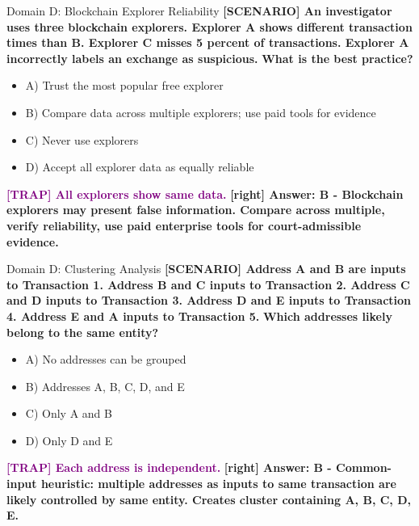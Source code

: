\documentclass[11pt,a4paper]{beamer}
\newcommand{\trap}[1]{\textcolor{purple}{\textbf{[TRAP] #1}}}
\newcommand{\correct}[1]{\textcolor{green!50!black}{\textbf{[right] #1}}}
\newcommand{\scenario}[1]{\textcolor{blue!70!black}{\textbf{[SCENARIO] #1}}}
\begin{document}
\begin{frame}{Domain D: Blockchain Explorer Reliability}
\scenario{An investigator uses three blockchain explorers. Explorer A shows different transaction times than B. Explorer C misses 5 percent of transactions. Explorer A incorrectly labels an exchange as suspicious.}
\vspace{0.2cm}
\textbf{What is the best practice?}
\vspace{0.2cm}
\begin{itemize}
    \item A) Trust the most popular free explorer
    \item B) Compare data across multiple explorers; use paid tools for evidence
    \item C) Never use explorers
    \item D) Accept all explorer data as equally reliable
\end{itemize}
\vspace{0.2cm}
\trap{All explorers show same data.}
\correct{Answer: B - Blockchain explorers may present false information. Compare across multiple, verify reliability, use paid enterprise tools for court-admissible evidence.}
\end{frame}

\begin{frame}{Domain D: Clustering Analysis}
\scenario{Address A and B are inputs to Transaction 1. Address B and C inputs to Transaction 2. Address C and D inputs to Transaction 3. Address D and E inputs to Transaction 4. Address E and A inputs to Transaction 5.}
\vspace{0.2cm}
\textbf{Which addresses likely belong to the same entity?}
\vspace{0.2cm}
\begin{itemize}
    \item A) No addresses can be grouped
    \item B) Addresses A, B, C, D, and E
    \item C) Only A and B
    \item D) Only D and E
\end{itemize}
\vspace{0.2cm}
\trap{Each address is independent.}
\correct{Answer: B - Common-input heuristic: multiple addresses as inputs to same transaction are likely controlled by same entity. Creates cluster containing A, B, C, D, E.}
\end{frame}
\end{document}
